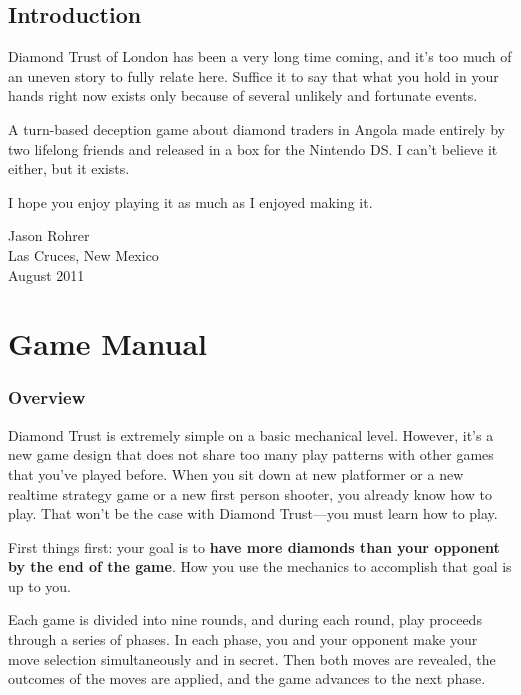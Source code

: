 \documentclass[8pt]{extbook}
\makeatletter
\newcommand{\startopenany}{\@openrightfalse}
\newcommand{\stopopenany}{\@openrighttrue}
\makeatother
\begin{document}
\frontmatter

\tableofcontents


\startopenany
\chapter{Introduction}

Diamond Trust of London has been a very long time coming, and it's too much of an uneven story to fully relate here.  Suffice it to say that what you hold in your hands right now exists only because of several unlikely and fortunate events.  

A turn-based deception game about diamond traders in Angola made entirely by two lifelong friends and released in a box for the Nintendo DS.  I can't believe it either, but it exists.  

I hope you enjoy playing it as much as I enjoyed making it.

\begin{flushright}
\begin{minipage}{1.5in}
Jason Rohrer\\
Las Cruces, New Mexico\\
August 2011
\end{minipage}
\end{flushright}


\stopopenany

\mainmatter

\part{Game Manual}
\addtocounter{chapter}{1}
\setcounter{section}{0}

\section{Overview}
Diamond Trust is extremely simple on a basic mechanical level.  However, it's a new game design that does not share too many play patterns with other games that you've played before.  When you sit down at new platformer or a new realtime strategy game or a new first person shooter, you already know how to play.  That won't be the case with Diamond Trust---you must learn how to play.

First things first:  your goal is to {\bf have more diamonds than your opponent by the end of the game}.  How you use the mechanics to accomplish that goal is up to you.

Each game is divided into nine rounds, and during each round, play proceeds through a series of phases.  In each phase, you and your opponent make your move selection simultaneously and in secret.  Then both moves are revealed, the outcomes of the moves are applied, and the game advances to the next phase.
\end{document}
